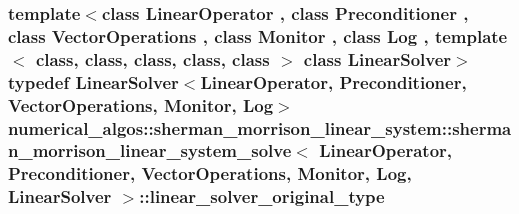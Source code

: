 \hypertarget{classnumerical__algos_1_1sherman__morrison__linear__system_1_1sherman__morrison__linear__system__solve_a863956a47581f9793061f860e0720b24}{
\subsubsection[{linear\-\_\-solver\-\_\-original\-\_\-type}]{\setlength{\rightskip}{0pt plus 5cm}template$<$class Linear\-Operator , class Preconditioner , class Vector\-Operations , class Monitor , class Log , template$<$ class, class, class, class, class $>$ class Linear\-Solver$>$ typedef Linear\-Solver$<$Linear\-Operator, Preconditioner, Vector\-Operations, Monitor, Log$>$ {\bf numerical\-\_\-algos\-::sherman\-\_\-morrison\-\_\-linear\-\_\-system\-::sherman\-\_\-morrison\-\_\-linear\-\_\-system\-\_\-solve}$<$ Linear\-Operator, Preconditioner, Vector\-Operations, Monitor, Log, Linear\-Solver $>$\-::{\bf linear\-\_\-solver\-\_\-original\-\_\-type}}}\label{classnumerical__algos_1_1sherman__morrison__linear__system_1_1sherman__morrison__linear__system__solve_a863956a47581f9793061f860e0720b24}
